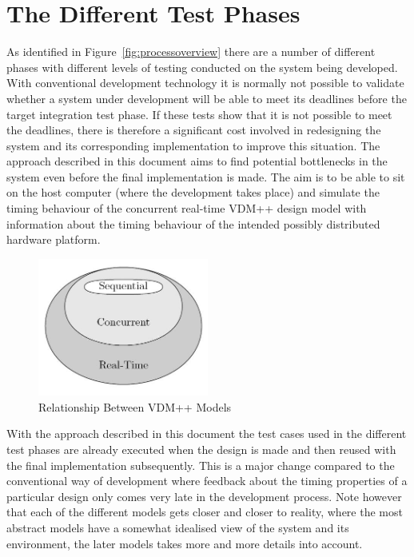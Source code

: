 \documentclass{overturerepchap}
\begin{document}
\section{The Different Test Phases}\label{sec:tests}

As identified in Figure~\ref{fig:processoverview} there are a number
of different phases with different levels of testing conducted on the
system being developed. With conventional development technology it is
normally not possible to validate whether a system under development
will be able to meet its deadlines before the target integration test
phase. If these tests show that it is not possible to meet the
deadlines, there is therefore a significant cost involved in
redesigning the system and its corresponding implementation to improve
this situation. The approach described in this document aims to find
potential bottlenecks in the system even before the final
implementation is made. The aim is to be able to sit on the host
computer (where the development takes place) and simulate the timing
behaviour of the concurrent real-time VDM++ design model with
information about the timing behaviour of the intended possibly
distributed hardware platform.

\begin{figure}
\begin{center}
\includegraphics[width=0.5\textwidth]{figures/VDM++levelsofmodels.jpg}
\end{center}
\caption{Relationship Between VDM++ Models}\label{fig:relationship}
\end{figure}

With the approach described in this document the test cases used in
the different test phases are already executed when the design is made
and then reused with the final implementation subsequently. This is a
major change compared to the conventional way of development where
feedback about the timing properties of a particular design only comes
very late in the development process. Note however that each of the different
models gets closer and closer to reality, where the most abstract models
have a somewhat idealised view of the system and its environment, the later
models takes more and more details into account.
\end{document}
